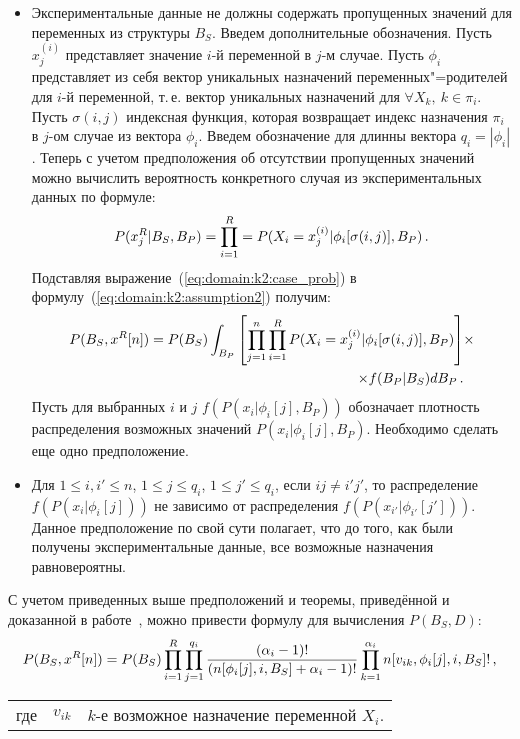 \begin{itemize}
  \item
  Экспериментальные данные не должны содержать пропущенных значений для переменных из структуры $B_S$. 
  Введем дополнительные обозначения.
  Пусть $x_j^{(i)}$ представляет значение $i$-й переменной в $j$-м случае.
  Пусть $\phi_i$ представляет из себя вектор уникальных назначений переменных"=родителей для $i$-й переменной, т.\,е. вектор уникальных назначений для $ \forall X_k,\ k \in \pi_i$.
  Пусть $\sigma(i, j)$ индексная функция, которая возвращает индекс назначения $\pi_i$ в $j$-ом случае из вектора $\phi_i$.
  Введем обозначение для длинны вектора $q_i = | \phi_i |$.
  Теперь с учетом предположения об отсутствии пропущенных значений можно вычислить вероятность конкретного случая из экспериментальных данных по формуле:
  \begin{equation}
    \label{eq:domain:k2:case_prob}
    P(x^R_j | B_S, B_P) = 
      \prod_{i = 1}^{R} = P(X_i = x_j^{(i)} | \phi_i[\sigma(i, j)], B_P) \text{\,.}
  \end{equation}
  Подставляя выражение~(\ref{eq:domain:k2:case_prob}) в формулу~(\ref{eq:domain:k2:assumption2}) получим:
  \begin{align}
    \label{eq:domain:k2:assumption3}
    P(B_S, x^R[n]) =
      P(B_S)
      \int_{B_P}\left[ \prod_{j = 1}^{n}\prod_{i = 1}^{R} P(X_i = x_j^{(i)} | \phi_i[\sigma(i, j)], B_P)  \right] &\times \notag\\ 
      \times f(B_P | B_S) dB_P \text{\,.}
  \end{align}
  Пусть для выбранных $i$ и $j$ $f(P(x_i | \phi_i[j], B_P))$ обозначает плотность распределения возможных значений $P(x_i | \phi_i[j], B_P)$.
  Необходимо сделать еще одно предположение.

  \item Для $ 1 \le i, i' \le n$, $ 1 \le j \le q_i $, $1 \le j' \le q_i $, если 
  $ij \neq i'j'$, то распределение $f(P(x_i | \phi_i[j]))$ не зависимо от распределения $f(P(x_{i'} | \phi_{i'}[{j'}]))$.
  Данное предположение по свой сути полагает, что до того, как были получены экспериментальные данные, все возможные назначения равновероятны.
\end{itemize}

С учетом приведенных выше предположений и теоремы, приведённой и доказанной в работе~\cite{Cooper1991}, можно привести формулу для вычисления $P(B_S, D)$:
\begin{equation}
  \label{eq:domain:k2:model_and_data_prob}
  P(B_S, x^R[n]) = 
    P(B_S)
    \prod_{i = 1}^{R}
    \prod_{j = 1}^{q_i}
    \frac{(\alpha_i - 1)!}
         {(n[\phi_i[j], i, B_S] + \alpha_i - 1)!}
    \prod_{k = 1}^{\alpha_i}
      n[v_{ik}, \phi_i[j], i, B_S]! \text{\,,}
\end{equation}
\par
\begin{tabular}{@{}ll@{ --- }p{}}
где & $ v_{ik} $ & $k$-е возможное назначение переменной $X_i$. \\[\parsep]
\end{tabular}

